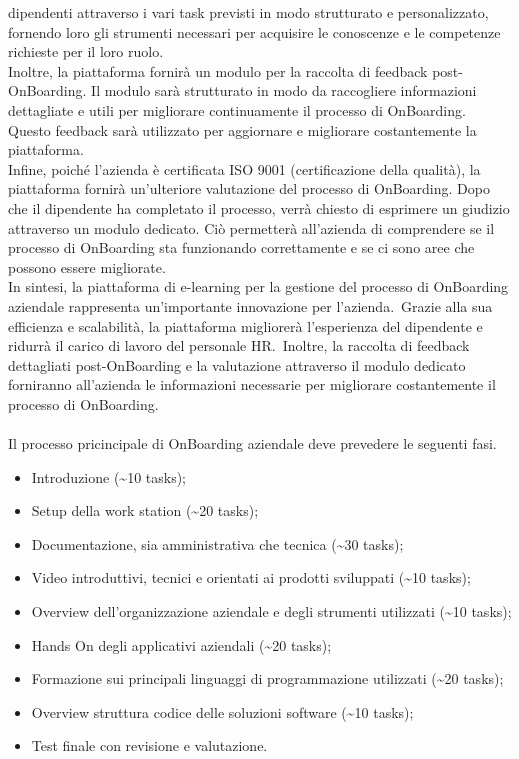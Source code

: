 dipendenti attraverso i vari task previsti in modo strutturato e personalizzato, 
fornendo loro gli strumenti necessari per acquisire le conoscenze e le competenze 
richieste per il loro ruolo. \\
Inoltre, la piattaforma fornirà un modulo per la raccolta di feedback post-OnBoarding. 
Il modulo sarà strutturato in modo da raccogliere informazioni dettagliate e utili per 
migliorare continuamente il processo di OnBoarding. Questo feedback sarà utilizzato 
per aggiornare e migliorare costantemente la piattaforma. \\ 
Infine, poiché l'azienda è certificata ISO 9001 (certificazione della qualità), la 
piattaforma fornirà un'ulteriore valutazione del processo di OnBoarding. Dopo che il 
dipendente ha completato il processo, verrà chiesto di esprimere un giudizio 
attraverso un modulo dedicato. Ciò permetterà all'azienda di comprendere se il 
processo di OnBoarding sta funzionando correttamente e se ci sono aree che 
possono essere migliorate. \\ 
In sintesi, la piattaforma di e-learning per la gestione del processo di OnBoarding 
aziendale rappresenta un'importante innovazione per l'azienda.\ Grazie alla sua 
efficienza e scalabilità, la piattaforma migliorerà l'esperienza del dipendente e ridurrà 
il carico di lavoro del personale HR.\ Inoltre, la raccolta di feedback dettagliati post-OnBoarding
 e la valutazione attraverso il modulo dedicato forniranno all'azienda le 
informazioni necessarie per migliorare costantemente il processo di OnBoarding.
\\ \\
Il processo pricincipale di OnBoarding aziendale deve prevedere le seguenti fasi.
\begin{itemize}
    \item Introduzione (\textasciitilde{10} tasks);
    \item Setup della work station (\textasciitilde{20} tasks);
    \item Documentazione, sia amministrativa che tecnica (\textasciitilde{30} tasks);
    \item Video introduttivi, tecnici e orientati ai prodotti sviluppati (\textasciitilde{10} tasks);
    \item Overview dell'organizzazione aziendale e degli strumenti utilizzati (\textasciitilde{10} tasks);
    \item Hands On degli applicativi aziendali (\textasciitilde{20} tasks);
    \item Formazione sui principali linguaggi di programmazione utilizzati (\textasciitilde{20} tasks);
    \item Overview struttura codice delle soluzioni software (\textasciitilde{10} tasks);
    \item Test finale con revisione e valutazione.
\end{itemize}
